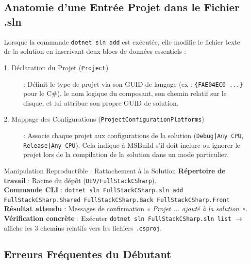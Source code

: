 \documentclass[a4paper,11pt]{report}
\begin{document}
\newpage

\subsection*{Anatomie d'une Entrée Projet dans le Fichier .sln}

Lorsque la commande \texttt{dotnet sln add} est exécutée, elle modifie le fichier texte de la solution en inscrivant deux blocs de données essentiels :

\begin{description}
    \item[\color{secondary}1. Déclaration du Projet (\texttt{Project})] : Définit le type de projet via son GUID de langage (ex : \texttt{\{FAE04EC0-...\}} pour le C\#), le nom logique du composant, son chemin relatif sur le disque, et lui attribue son propre GUID de solution.
    \item[\color{cyanproj!90!black}2. Mappage des Configurations (\texttt{ProjectConfigurationPlatforms})] : Associe chaque projet aux configurations de la solution (\texttt{Debug|Any CPU}, \texttt{Release|Any CPU}). Cela indique à MSBuild s'il doit inclure ou ignorer le projet lors de la compilation de la solution dans un mode particulier.
\end{description}

\vspace{0.3cm}

\begin{bestpracticebox}{Manipulation Reproductible : Rattachement à la Solution}
\textbf{Répertoire de travail} : Racine du dépôt (\texttt{DEV/FullStackCSharp}).\\[2pt]
\textbf{Commande CLI} : \texttt{dotnet sln FullStackCSharp.sln add FullStackCSharp.Shared FullStackCSharp.Back FullStackCSharp.Front}\\[2pt]
\textbf{Résultat attendu} : Messages de confirmation \textit{« Projet ... ajouté à la solution »}.\\[2pt]
\textbf{Vérification concrète} : Exécuter \texttt{dotnet sln FullStackCSharp.sln list} $\longrightarrow$ affiche les 3 chemins relatifs vers les fichiers \texttt{.csproj}.
\end{bestpracticebox}

\vspace{0.2cm}

\subsection*{Erreurs Fréquentes du Débutant}
\end{document}

